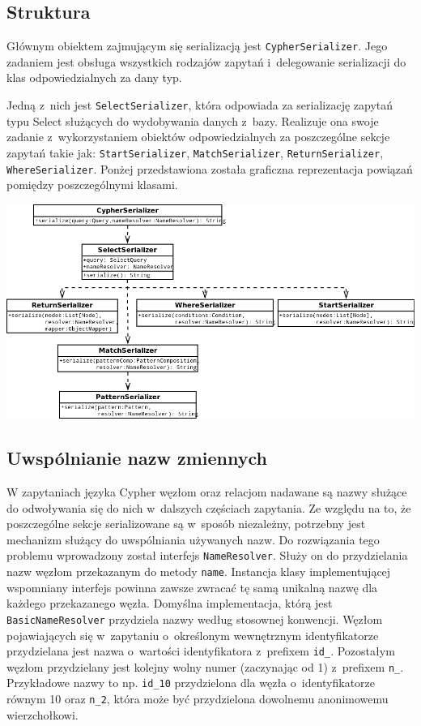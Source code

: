 \documentclass[brudnopis]{xmgr}
\begin{document}
\subsection{Struktura}

Głównym obiektem zajmującym się serializacją jest \texttt{CypherSerializer}. Jego zadaniem jest obsługa wszystkich rodzajów zapytań i~delegowanie serializacji do klas odpowiedzialnych za dany typ.

Jedną z~nich jest \texttt{SelectSerializer}, która odpowiada za serializację zapytań typu Select służących do wydobywania danych z~bazy. Realizuje ona swoje zadanie z~wykorzystaniem obiektów odpowiedzialnych za poszczególne sekcje zapytań takie jak: \texttt{StartSerializer}, \texttt{MatchSerializer}, \texttt{ReturnSerializer}, \texttt{WhereSerializer}. Ponżej przedstawiona została graficzna reprezentacja powiązań pomiędzy poszczególnymi klasami.

\includegraphics[scale=0.5]{images/cypher-serialization-uml.png}

\subsection{Uwspólnianie nazw zmiennych}

W zapytaniach języka Cypher węzłom oraz relacjom nadawane są nazwy służące do odwoływania się do nich w~dalszych częściach zapytania. Ze względu na to, że poszczególne sekcje serializowane są w~sposób niezależny, potrzebny jest mechanizm służący do uwspólniania używanych nazw. Do rozwiązania tego problemu wprowadzony został interfejs \texttt{NameResolver}. Służy on do przydzielania nazw węzłom przekazanym do metody \texttt{name}. Instancja klasy implementującej wspomniany interfejs powinna zawsze zwracać tę samą unikalną nazwę dla każdego przekazanego węzła. Domyślna implementacja, którą jest \texttt{BasicNameResolver} przydziela nazwy według stosownej konwencji. Węzłom pojawiających się w~zapytaniu o~określonym wewnętrznym identyfikatorze przydzielana jest nazwa o~wartości identyfikatora z~prefixem \texttt{id\_}. Pozostałym węzłom przydzielany jest kolejny wolny numer (zaczynając od 1) z~prefixem \texttt{n\_}. Przykładowe nazwy to np. \texttt{id\_10} przydzielona dla węzła o~identyfikatorze równym 10 oraz \texttt{n\_2}, która może być przydzielona dowolnemu anonimowemu wierzchołkowi.
\end{document}
